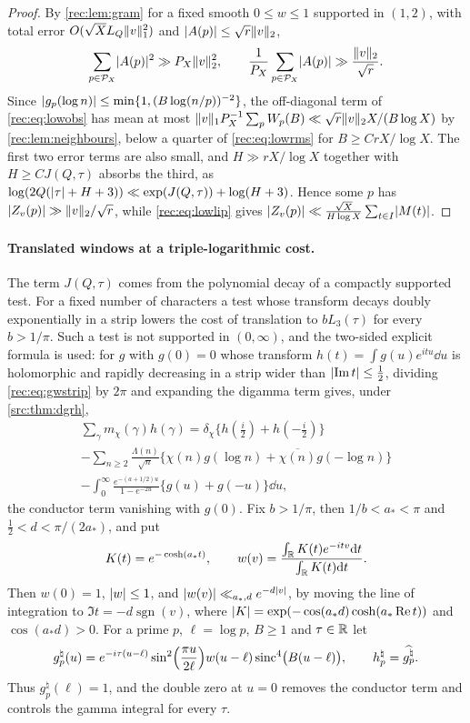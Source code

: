 \begin{proof}
By \cref{rec:lem:gram} for a fixed smooth $0\le w\le1$ supported in $(1,2)$, with total error
$O(\sqrt XL_Q\lVert v\rVert_1^2)$ and $\lvert A(p)\rvert\le\sqrt r\lVert v\rVert_2$,
\begin{equation}\label{rec:eq:lowrms}
 \sum_{p\in\mathcal P_X}\lvert A(p)\rvert^2\gg P_X\lVert v\rVert_2^2,\qquad\frac1{P_X}\sum_{p\in\mathcal P_X}\lvert A(p)\rvert\gg\frac{\lVert v\rVert_2}{\sqrt r}.
\end{equation}
Since $\lvert g_p(\log n)\rvert\le\min\{1,(B\log(n/p))^{-2}\}$, the off-diagonal term of \eqref{rec:eq:lowobs} has mean at
most $\lVert v\rVert_1P_X^{-1}\sum_pW_p(B)\ll\sqrt r\lVert v\rVert_2X/(B\log X)$ by \cref{rec:lem:neighbours}, below a quarter of
\eqref{rec:eq:lowrms} for $B\ge CrX/\log X$. The first two error terms are also small, and
$H\gg rX/\log X$ together with $H\ge CJ(Q,\tau)$ absorbs the third, as
$\log(2Q(\lvert\tau\rvert+H+3))\ll\exp(J(Q,\tau))+\log(H+3)$. Hence some $p$ has $\lvert Z_v(p)\rvert\gg\lVert v\rVert_2/\sqrt r$, while
\eqref{rec:eq:lowlip} gives $\lvert Z_v(p)\rvert\ll\frac{\sqrt X}{H\log X}\sum_{t\in I}\lvert M(t)\rvert$.
\end{proof}

\paragraph{Translated windows at a triple-logarithmic cost.}
The term $J(Q,\tau)$ comes from the polynomial decay of a compactly supported test. For a fixed number
of characters a test whose transform decays doubly exponentially in a strip lowers the cost of
translation to $bL_3(\tau)$ for every $b>1/\pi$. Such a test is not supported in $(0,\infty)$, and the
two-sided explicit formula is used: for $g$ with $g(0)=0$ whose transform $h(t)=\int g(u)e^{itu}\dd u$ is
holomorphic and rapidly decreasing in a strip wider than $\lvert\operatorname{Im} t\rvert\le\tfrac12$, dividing
\eqref{rec:eq:gwstrip} by $2\pi$ and expanding the digamma term gives, under \cref{src:thm:dgrh},
\begin{multline}\label{rec:eq:fullweil}
 \sum_\gamma m_\chi(\gamma)h(\gamma)=\delta_\chi\bigl\{h(\tfrac i2)+h(-\tfrac i2)\bigr\}\\
 -\sum_{n\ge2}\frac{\Lambda(n)}{\sqrt n}\bigl\{\chi(n)g(\log n)+\overline{\chi(n)}g(-\log n)\bigr\}\\
 -\int_0^\infty\frac{e^{-(a+1/2)u}}{1-e^{-2u}}\bigl\{g(u)+g(-u)\bigr\}\dd u,
\end{multline}
the conductor term vanishing with $g(0)$. Fix $b>1/\pi$, then
$1/b<a_*<\pi$ and $\tfrac12<d<\pi/(2a_*)$, and put
\[
 K(t)=e^{-\cosh(a_*t)},\qquad w(v)=\frac{\int_{\mathbb{R}} K(t)e^{-itv}\mathrm{d} t}{\int_{\mathbb{R}} K(t)\mathrm{d} t}.
\]
Then $w(0)=1$, $\lvert w\rvert\le1$, and $\lvert w(v)\rvert\ll_{a_*,d}e^{-d\lvert v\rvert}$, by moving the line of integration to
$\Im t=-d\operatorname{sgn}(v)$, where $\lvert K\rvert=\exp(-\cos(a_*d)\cosh(a_*\operatorname{Re} t))$ and $\cos(a_*d)>0$. For a prime $p$,
$\ell=\log p$, $B\ge1$ and $\tau\in\mathbb{R}$ let
\[
 g_p^\natural(u)=e^{-i\tau(u-\ell)}\sin^2\Bigl(\frac{\pi u}{2\ell}\Bigr)w(u-\ell)\operatorname{sinc}^4\bigl(B(u-\ell)\bigr),\qquad
 h_p^\natural=\widehat{g_p^\natural}.
\]
Thus $g_p^\natural(\ell)=1$, and the double zero at $u=0$ removes the conductor term and controls the gamma
integral for every $\tau$.

